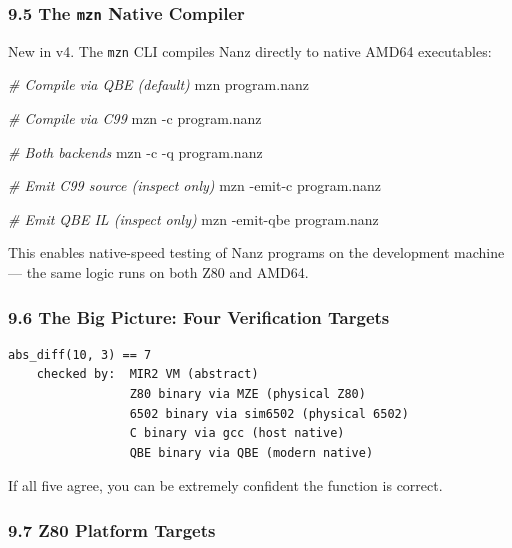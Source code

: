 \documentclass[
  11pt,
  a4paper,
]{report}
\newenvironment{Shaded}{\begin{snugshade}\small}{\end{snugshade}}
\newcommand{\AttributeTok}[1]{\textcolor[rgb]{0.13,0.29,0.53}{#1}}
\newcommand{\CommentTok}[1]{\textcolor[rgb]{0.56,0.35,0.01}{\textit{#1}}}
\newcommand{\ExtensionTok}[1]{#1}
\newcommand{\NormalTok}[1]{#1}
\begin{document}
\subsubsection{\texorpdfstring{9.5 The \texttt{mzn} Native
Compiler}{9.5 The mzn Native Compiler}}\label{the-mzn-native-compiler}

New in v4. The \texttt{mzn} CLI compiles Nanz directly to native AMD64
executables:

\begin{Shaded}
\begin{Highlighting}[]
\CommentTok{\# Compile via QBE (default)}
\ExtensionTok{mzn}\NormalTok{ program.nanz}

\CommentTok{\# Compile via C99}
\ExtensionTok{mzn} \AttributeTok{{-}c}\NormalTok{ program.nanz}

\CommentTok{\# Both backends}
\ExtensionTok{mzn} \AttributeTok{{-}c} \AttributeTok{{-}q}\NormalTok{ program.nanz}

\CommentTok{\# Emit C99 source (inspect only)}
\ExtensionTok{mzn} \AttributeTok{{-}emit{-}c}\NormalTok{ program.nanz}

\CommentTok{\# Emit QBE IL (inspect only)}
\ExtensionTok{mzn} \AttributeTok{{-}emit{-}qbe}\NormalTok{ program.nanz}
\end{Highlighting}
\end{Shaded}

This enables native-speed testing of Nanz programs on the development
machine --- the same logic runs on both Z80 and AMD64.

\subsubsection{9.6 The Big Picture: Four Verification
Targets}\label{the-big-picture-four-verification-targets}

\begin{verbatim}
abs_diff(10, 3) == 7
    checked by:  MIR2 VM (abstract)
                 Z80 binary via MZE (physical Z80)
                 6502 binary via sim6502 (physical 6502)
                 C binary via gcc (host native)
                 QBE binary via QBE (modern native)
\end{verbatim}

If all five agree, you can be extremely confident the function is
correct.

\subsubsection{9.7 Z80 Platform Targets}\label{z80-platform-targets}
\end{document}
